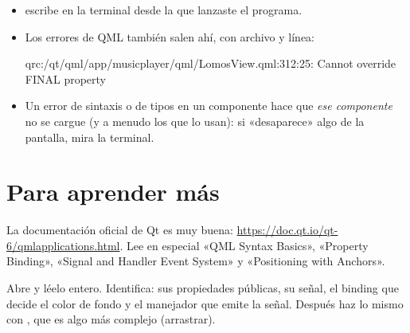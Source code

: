 \begin{itemize}
  \item {} escribe en la terminal desde la que lanzaste el
  programa.
  \item Los errores de QML también salen ahí, con archivo y línea:
\begin{terminal}
qrc:/qt/qml/app/musicplayer/qml/LomosView.qml:312:25: Cannot override FINAL property
\end{terminal}
  \item Un error de sintaxis o de tipos en un componente hace que \emph{ese componente} no se
  cargue (y a menudo los que lo usan): si «desaparece» algo de la pantalla, mira la terminal.
\end{itemize}

\section{Para aprender más}

La documentación oficial de Qt es muy buena: \url{https://doc.qt.io/qt-6/qmlapplications.html}.
Lee en especial «QML Syntax Basics», «Property Binding», «Signal and Handler Event System» y
«Positioning with Anchors».

\begin{ejercicio}
Abre  y léelo entero. Identifica: sus propiedades públicas, su
señal, el binding que decide el color de fondo y el manejador que emite la señal. Después haz
lo mismo con , que es algo más complejo (arrastrar).
\end{ejercicio}

